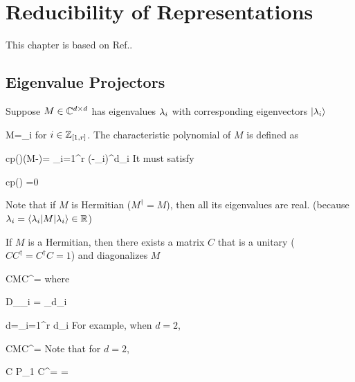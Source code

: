 \chapter{Reducibility of Representations}
\label{ch-reducibility}

This chapter is based on
Ref.\cite{birdtracks-book}.

\section{Eigenvalue Projectors}

Suppose $M\in { \mathbb{C}}^{d\times d }$ 
has eigenvalues 
$\lambda_i$ with corresponding eigenvectors $|\lambda_i\rangle$

\beq
M=\lam_i 
\eeq
for $i\in {\mathbb{Z}}_{[1,r]}$.
The characteristic polynomial of $M$ is
defined as

\beq
cp(\lam)\eqdef \det(M-\lam)= \prod_{i=1}^r (\lam-\lam_i)^{d_i}
\eeq
It must satisfy

\beq
cp(\lam) =0
\eeq

Note 
that if $M$ is Hermitian 
($M^\dagger=M$),
then all its eigenvalues  are real. (because $\lambda_i =
\left\langle\lambda_i|M|\lambda_i\right\rangle\in{ \mathbb{R}}$)




If $M$ is a Hermitian, then there exists
a matrix $C$ that is a unitary ($CC^\dagger = C^\dagger C =1$)
and diagonalizes $M$

\beq
CMC^\dagger=
\eeq
where

\beq
D_{\lam_i} =
_{d_i}
\eeq

\beq
d=\sum_{i=1}^r d_i
\eeq
For example,
when $d=2$, 


\beq
CMC^\dagger =
\eeq
Note that for $d=2$,

\beq
C P_1 C^\dagger=
\left[
\begin{array}{cc}
1&0
\\
0&0
\end{array}
\right]
=
\eeq

